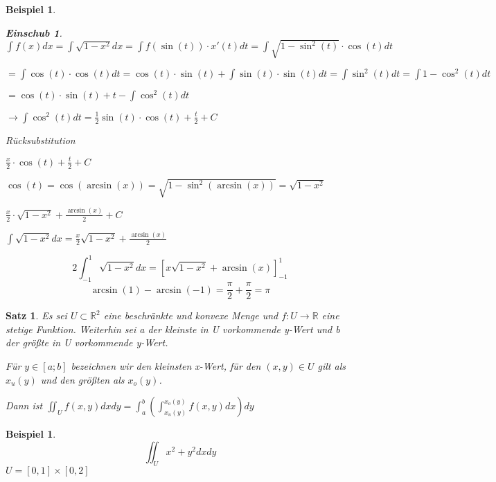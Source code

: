 \documentclass[12pt,a4paper]{scrreprt}
\newtheorem{beispiel}[defi]{Beispiel}
\newtheorem{satz}[defi]{Satz}
\newtheorem*{einschub}{Einschub}
\begin{document}
\begin{beispiel}
\begin{enumerate}
\begin{einschub}
			$\int f(x)dx=\int \sqrt{1-x^2}dx=\int f(\sin(t))\cdot x'(t)dt=\int \sqrt{1-\sin^2(t)}\cdot\cos(t)dt$

			$=\int \cos(t)\cdot\cos(t)dt=\cos(t)\cdot\sin(t)+\int \sin(t)\cdot\sin(t)dt=\int \sin^2(t)dt=\int 1-\cos^2(t)dt$

			$=\cos(t)\cdot\sin(t)+t-\int \cos^2(t)dt$

			$\to \int \cos^2(t)dt=\frac{1}{2}\sin(t)\cdot\cos(t)+\frac{t}{2}+C$

			Rücksubstitution

			$\frac{x}{2}\cdot\cos(t)+\frac{t}{2}+C$

			$\cos(t)=\cos(\arcsin(x))=\sqrt{1-\sin^2(\arcsin(x))}=\sqrt{1-x^2}$

			$\frac{x}{2}\cdot\sqrt{1-x^2}+\frac{\arcsin(x)}{2}+C$

			$\int \sqrt{1-x^2}dx=\frac{x}{2}\sqrt{1-x^2}+\frac{\arcsin(x)}{2}$
		\end{einschub}
		\[2\int_{-1}^1 \sqrt{1-x^2}dx=\left[x\sqrt{1-x^2}+\arcsin(x)\right]^1_{-1}\]
		\[\arcsin(1)-\arcsin(-1)=\frac{\pi}{2}+\frac{\pi}{2}=\pi\]
		\end{enumerate}
	\end{beispiel}

	\begin{satz}
		Es sei $U\subset\mathbb{R}^2$ eine beschränkte und konvexe Menge und $f:U\to\mathbb{R}$ eine stetige Funktion. Weiterhin sei a der kleinste in U vorkommende y-Wert und b der größte in U vorkommende y-Wert.

		Für $y\in[a;b]$ bezeichnen wir den kleinsten x-Wert, für den $(x,y)\in U$ gilt als $x_u(y)$ und den größten als $x_o(y)$.

		Dann ist $\iint_U f(x,y)dxdy=\int_a^b \left(\int_{x_u(y)}^{x_o(y)} f(x,y)dx\right)dy$
	\end{satz}

	\begin{beispiel}
		\[\iint_U x^2+y^2dxdy\] $U=\left[0,1\right]\times\left[0,2\right]$

	\end{beispiel}
\end{document}
